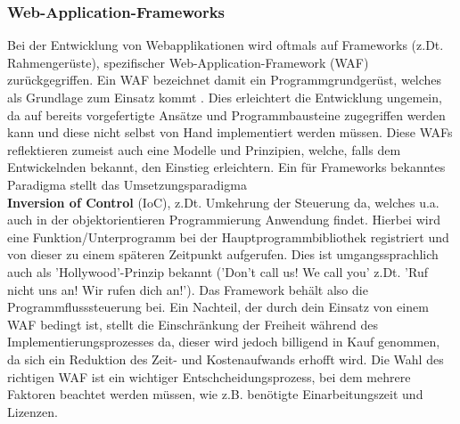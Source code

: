 \subsubsection{Web-Application-Frameworks} \label{sec:wafs}
Bei der Entwicklung von Webapplikationen wird oftmals auf Frameworks (z.Dt. Rahmengerüste), spezifischer Web-Application-Framework (WAF) zurückgegriffen. 
Ein WAF bezeichnet damit ein Programmgrundgerüst, welches als Grundlage zum Einsatz kommt \cite{Ionis2019:online}. Dies erleichtert die Entwicklung ungemein, da auf bereits vorgefertigte Ansätze und Programmbausteine zugegriffen werden kann und diese nicht selbst von Hand implementiert werden müssen. Diese WAFs reflektieren zumeist auch eine Modelle und Prinzipien, welche, falls dem Entwickelnden bekannt, den Einstieg erleichtern. 
Ein für Frameworks bekanntes Paradigma stellt das Umsetzungsparadigma \\
\textbf{Inversion of Control} (IoC), z.Dt. Umkehrung der Steuerung da, welches u.a. auch in der objektorientieren Programmierung Anwendung findet.
Hierbei wird eine Funktion/Unterprogramm bei der Hauptprogrammbibliothek registriert und von dieser zu einem späteren Zeitpunkt aufgerufen. Dies ist umgangssprachlich auch als 'Hollywood'-Prinzip bekannt ('Don't call us! We call you' z.Dt. 'Ruf nicht uns an! Wir rufen dich an!'). Das Framework behält also die Programmflusssteuerung bei. 
  Ein Nachteil, der durch dein Einsatz von einem WAF bedingt ist, stellt die Einschränkung der Freiheit während des Implementierungsprozesses da, dieser wird jedoch billigend in Kauf genommen, da sich ein Reduktion des Zeit- und Kostenaufwands erhofft wird. Die Wahl des richtigen WAF ist ein wichtiger Entschcheidungsprozess, bei dem mehrere Faktoren beachtet werden müssen, wie z.B. benötigte Einarbeitungszeit und Lizenzen.

